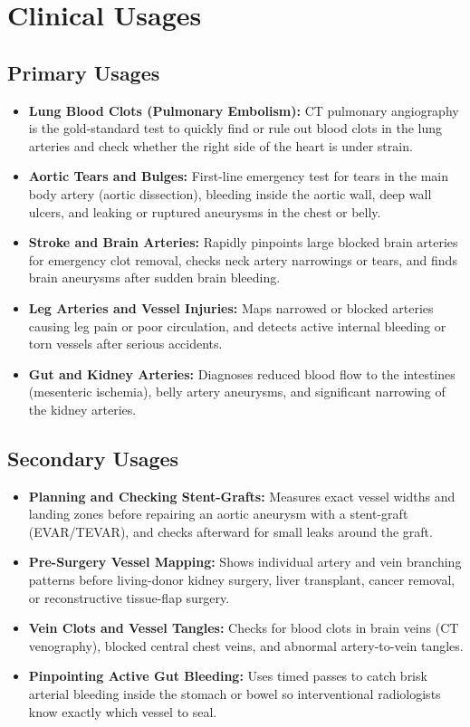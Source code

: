 \section{Clinical Usages}

\subsection{Primary Usages}
\begin{itemize}
    \item \textbf{Lung Blood Clots (Pulmonary Embolism):} CT pulmonary angiography is the gold-standard test to quickly find or rule out blood clots in the lung arteries and check whether the right side of the heart is under strain.
    \item \textbf{Aortic Tears and Bulges:} First-line emergency test for tears in the main body artery (aortic dissection), bleeding inside the aortic wall, deep wall ulcers, and leaking or ruptured aneurysms in the chest or belly.
    \item \textbf{Stroke and Brain Arteries:} Rapidly pinpoints large blocked brain arteries for emergency clot removal, checks neck artery narrowings or tears, and finds brain aneurysms after sudden brain bleeding.
    \item \textbf{Leg Arteries and Vessel Injuries:} Maps narrowed or blocked arteries causing leg pain or poor circulation, and detects active internal bleeding or torn vessels after serious accidents.
    \item \textbf{Gut and Kidney Arteries:} Diagnoses reduced blood flow to the intestines (mesenteric ischemia), belly artery aneurysms, and significant narrowing of the kidney arteries.
\end{itemize}

\subsection{Secondary Usages}
\begin{itemize}
    \item \textbf{Planning and Checking Stent-Grafts:} Measures exact vessel widths and landing zones before repairing an aortic aneurysm with a stent-graft (EVAR/TEVAR), and checks afterward for small leaks around the graft.
    \item \textbf{Pre-Surgery Vessel Mapping:} Shows individual artery and vein branching patterns before living-donor kidney surgery, liver transplant, cancer removal, or reconstructive tissue-flap surgery.
    \item \textbf{Vein Clots and Vessel Tangles:} Checks for blood clots in brain veins (CT venography), blocked central chest veins, and abnormal artery-to-vein tangles.
    \item \textbf{Pinpointing Active Gut Bleeding:} Uses timed passes to catch brisk arterial bleeding inside the stomach or bowel so interventional radiologists know exactly which vessel to seal.
\end{itemize}

